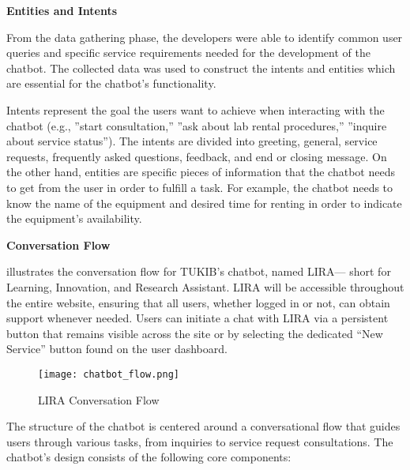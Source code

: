 \textbf{Entities and Intents}

From the data gathering phase, the developers were able to identify common user queries and specific service requirements needed for the development of the chatbot. The collected data was used to construct the intents and entities which are essential for the chatbot’s functionality. 

Intents represent the goal the users want to achieve when interacting with the chatbot (e.g., ”start consultation,” ”ask about lab rental procedures,” ”inquire about service status”). The intents are divided into greeting, general, service requests, frequently asked questions, feedback, and end or closing message. On the other hand, entities are specific pieces of information that the chatbot needs to get from the user in order to fulfill a task. For example, the chatbot needs to know the name of the equipment and desired time for renting in order to indicate the equipment's availability. 

\newpage

\noindent \textbf{Conversation Flow}

 illustrates the conversation flow for TUKIB's chatbot, named LIRA— short for Learning, Innovation, and Research Assistant. LIRA will be accessible throughout the entire website, ensuring that all users, whether logged in or not, can obtain support whenever needed. Users can initiate a chat with LIRA via a persistent button that remains visible across the site or by selecting the dedicated “New Service” button found on the user dashboard.

\begin{figure}[h]
	\centering 
	\texttt{[image: chatbot\_flow.png]}
	\caption{LIRA Conversation Flow}
	\label{fig:chatbot_flow}
\end{figure}

The structure of the chatbot is centered around a conversational flow that guides users through various tasks, from inquiries to service request consultations. The chatbot’s design consists of the following core components:

